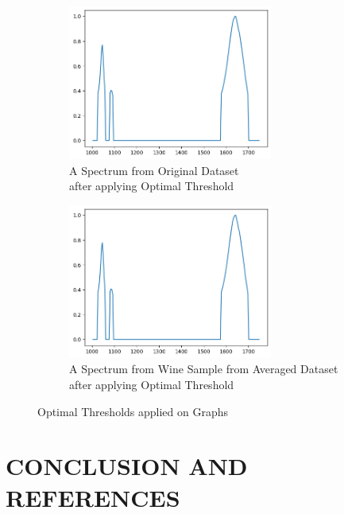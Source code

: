 \documentclass{article}
\begin{document}
\begin{figure}[H]
\centering
\begin{subfigure}{0.5\textwidth}
\centering
\includegraphics[height=2in]{Original Dataset optimal image.png}
\caption[Optional Caption]{A Spectrum from Original Dataset \\after applying Optimal Threshold}
\end{subfigure}%
\begin{subfigure}{0.5\textwidth}
\centering
\includegraphics[height=2in]{Avergaed Dataset optimal image.png}
\caption[Optional Caption]{A Spectrum from Wine Sample from Averaged Dataset \\after applying Optimal Threshold}
\end{subfigure}
\caption[Optional Caption]{Optimal Thresholds applied on Graphs}
\end{figure}


\newpage
\section{CONCLUSION AND REFERENCES} 
\end{document}
